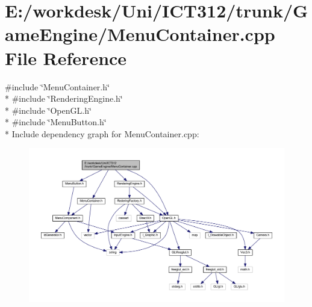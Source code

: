 \section{E\+:/workdesk/\+Uni/\+I\+C\+T312/trunk/\+Game\+Engine/\+Menu\+Container.cpp File Reference}
\label{_menu_container_8cpp}
{\ttfamily \#include \char`\"{}Menu\+Container.\+h\char`\"{}}\\*
{\ttfamily \#include \char`\"{}Rendering\+Engine.\+h\char`\"{}}\\*
{\ttfamily \#include \char`\"{}Open\+G\+L.\+h\char`\"{}}\\*
{\ttfamily \#include \char`\"{}Menu\+Button.\+h\char`\"{}}\\*
Include dependency graph for Menu\+Container.\+cpp\+:\nopagebreak
\begin{figure}[H]
\begin{center}
\leavevmode
\includegraphics[width=350pt]{d9/dff/_menu_container_8cpp__incl}
\end{center}
\end{figure}
